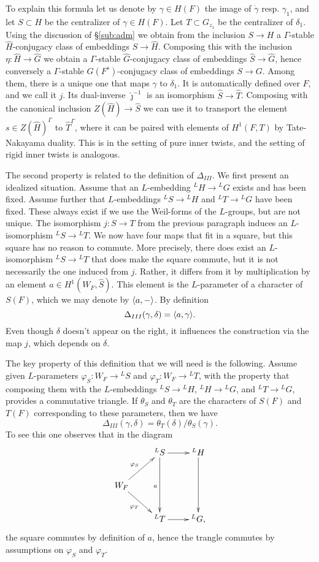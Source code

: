 \documentclass{article}
\theoremstyle{definition}
\numberwithin{equation}{section}
\renewcommand{\-}{\hyp{}}
\begin{document}
To explain this formula let us denote by $\gamma \in H(F)$ the image of $\dot\gamma$ resp. $\gamma_1$, and let $S \subset H$ be the centralizer of $\gamma \in H(F)$. Let $T \subset G_{z_1}$ be the centralizer of $\delta_1$. Using the discussion of \S\ref{sub:adm} we obtain from the inclusion $S \to H$ a $\Gamma$-stable $\hat H$-conjugacy class of embeddings $\hat S \to \hat H$. Composing this with the inclusion $\eta : \hat H \to \hat G$ we obtain a $\Gamma$-stable $\hat G$-conjugacy class of embeddings $\hat S \to \hat G$, hence conversely a $\Gamma$-stable $G(F^s)$-conjugacy class of embeddings $S \to G$. Among them, there is a unique one that maps $\gamma$ to $\delta_1$. It is automatically defined over $F$, and we call it $j$. Its dual-inverse $\hat\jmath^{-1}$ is an isomorphism $\hat S \to \hat T$. Composing with the canonical inclusion $Z(\hat H) \to \hat S$ we can use it to transport the element $s \in Z(\hat H)^\Gamma$ to $\hat T^\Gamma$, where it can be paired with elements of $H^1(F,T)$ by Tate-Nakayama duality. This is in the setting of pure inner twists, and the setting of rigid inner twists is analogous.

The second property is related to the definition of $\Delta_{III}$. We  first present an idealized situation. Assume that an $L$\-embedding $^LH \to {^LG}$ exists and has been fixed. Assume further that $L$\-embeddings $^LS \to {^LH}$ and $^LT \to {^LG}$ have been fixed. These always exist if we use the Weil-forms of the $L$\-groups, but are not unique. The isomorphism $j : S \to T$ from the previous paragraph induces an $L$\-isomorphism $^LS \to {^LT}$. We now have four maps that fit in a square, but this square has no reason to commute. More precisely, there does exist an $L$\-isomorphism $^LS \to {^LT}$ that does make the square commute, but it is not necessarily the one induced from $j$. Rather, it differs from it by multiplication by an element $a \in H^1(W_F,\hat S)$. This element is the $L$\-parameter of a character of $S(F)$, which we may denote by $\langle a,-\rangle$. By definition
\[ \Delta_{III}(\gamma,\delta)=\langle a,\gamma\rangle. \]
Even though $\delta$ doesn't appear on the right, it influences the construction via the map $j$, which depends on $\delta$. 

The key property of this definition that we will need is the following. Assume given $L$\-parameters $\varphi_S : W_F \to {^LS}$ and $\varphi_T : W_F \to {^LT}$, with the property that composing them with the $L$\-embeddings $^LS \to {^LH}$, $^LH \to {^LG}$, and $^LT \to {^LG}$, provides a commutative triangle. If $\theta_S$ and $\theta_T$ are the characters of $S(F)$ and $T(F)$ corresponding to these parameters, then we have
\begin{equation} \label{eq:tfd3}
\Delta_{III}(\gamma,\delta) = \theta_T(\delta)/\theta_S(\gamma).	
\end{equation}
To see this one observes that in the diagram
\[ \xymatrix{
	&^LS\ar[dd]_a\ar[r]&^LH\ar[dd]\\
	W_F\ar[ru]^{\varphi_S}\ar[rd]_{\varphi_T}\\
	&^LT\ar[r]&^LG,
}
\]
the square commutes by definition of $a$, hence the trangle commutes by assumptions on $\varphi_S$ and $\varphi_T$.
\end{document}
